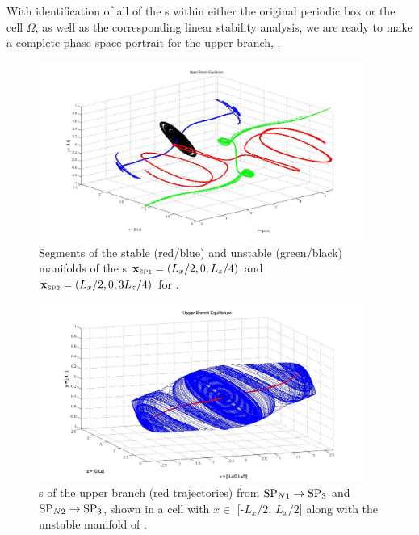 \documentclass[lineno]{jfm}
\begin{document}
With identification of all of the {\stagp}s within either the original 
periodic box or the cell $\Omega$, as well as the corresponding linear 
stability analysis, we are ready to make a complete phase space portrait 
for the upper branch, {\tEQtwo}.

\begin{figure}
\includegraphics[width=0.95\textwidth]{manifolds_both.jpg}
  \caption{
   Segments of the stable (red/blue) and unstable (green/black) manifolds of the \stagp s
   $\xSP{1} = (L_x/2,0,L_z/4)$ and
   $\xSP{2} = (L_x/2,0,3L_z/4)$ for {\tEQtwo}. 
   }
  \label{fig:manifolds_both}
 \end{figure}


    \begin{figure}
\includegraphics[width=0.95\textwidth]{man14_june3.jpg}
  \caption{
{\Hec}s of the upper branch (red trajectories) from 
${{\text{SP}_{N1}}} \to {\ensuremath{{\text{SP}_{3}}}}$ and ${{\text{SP}_{N2}}} \to {\ensuremath{{\text{SP}_{3}}}}$, shown in a cell with $x \in$ 
[-$L_x/2$, $L_x/2$] along with the unstable manifold of . 
   }
  \label{fig:hetero1}
 \end{figure}
\end{document}
